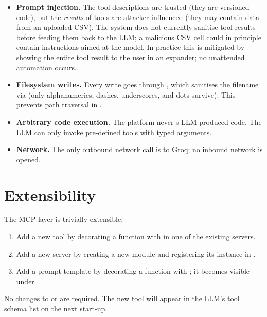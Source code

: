 \begin{itemize}[leftmargin=1.4em]
  \item \textbf{Prompt injection.} The tool descriptions are trusted
        (they are versioned code), but the \emph{results} of tools
        are attacker-influenced (they may contain data from an
        uploaded CSV). The system does not currently sanitise
        tool results before feeding them back to the LLM; a
        malicious CSV cell could in principle contain instructions
        aimed at the model. In practice this is mitigated by
        showing the entire tool result to the user in an expander;
        no unattended automation occurs.
  \item \textbf{Filesystem writes.} Every write goes through
        , which sanitises the filename
        via  (only alphanumerics, dashes,
        underscores, and dots survive). This prevents path traversal
        in .
  \item \textbf{Arbitrary code execution.} The platform never
        s LLM-produced code. The LLM can only invoke
        pre-defined tools with typed arguments.
  \item \textbf{Network.} The only outbound network call is to Groq;
        no inbound network is opened.
\end{itemize}

\section{Extensibility}
\label{sec:mcp-extensibility}

The MCP layer is trivially extensible:

\begin{enumerate}[leftmargin=1.4em]
  \item Add a new tool by decorating a function with
         in one of the existing servers.
  \item Add a new server by creating a new
         module and registering its
         instance in
        .
  \item Add a prompt template by decorating a function with
        ; it becomes visible under
        .
\end{enumerate}

No changes to  or
 are required. The new tool will appear
in the LLM's tool schema list on the next start-up.

